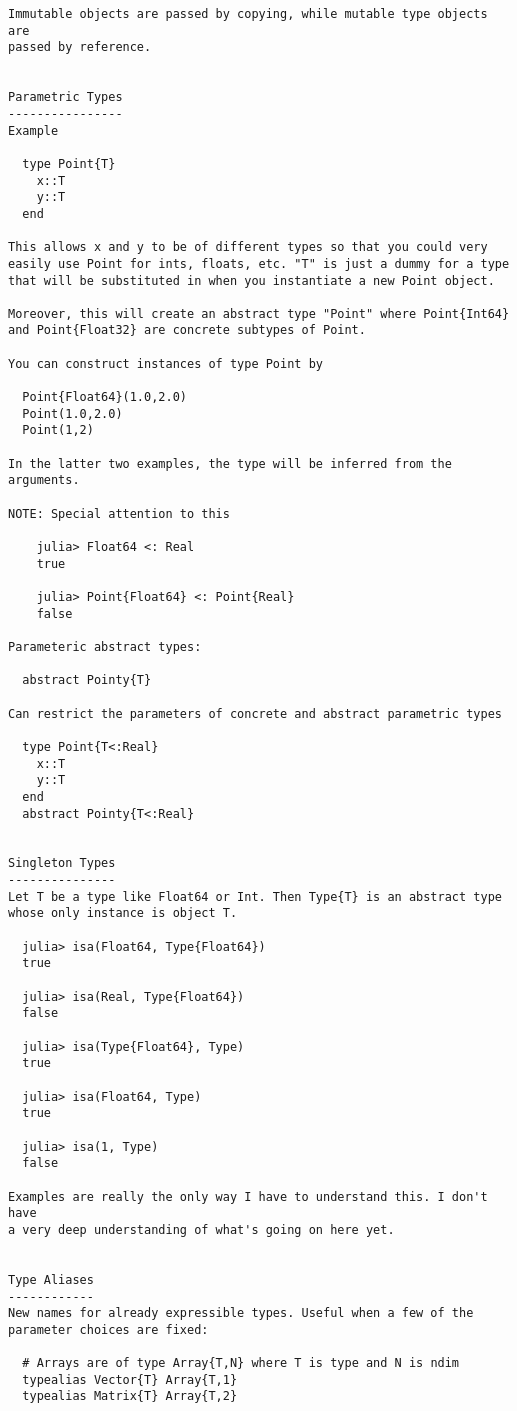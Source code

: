 \documentclass[12pt]{article}
\theoremstyle{plain}
\theoremstyle{definition}
\theoremstyle{remark}
\begin{document}
\begin{lstlisting}
Immutable objects are passed by copying, while mutable type objects are
passed by reference.


Parametric Types
----------------
Example

  type Point{T}
    x::T
    y::T
  end

This allows x and y to be of different types so that you could very
easily use Point for ints, floats, etc. "T" is just a dummy for a type
that will be substituted in when you instantiate a new Point object.

Moreover, this will create an abstract type "Point" where Point{Int64}
and Point{Float32} are concrete subtypes of Point.

You can construct instances of type Point by

  Point{Float64}(1.0,2.0)
  Point(1.0,2.0)
  Point(1,2)

In the latter two examples, the type will be inferred from the
arguments.

NOTE: Special attention to this

    julia> Float64 <: Real
    true

    julia> Point{Float64} <: Point{Real}
    false

Parameteric abstract types:

  abstract Pointy{T}

Can restrict the parameters of concrete and abstract parametric types

  type Point{T<:Real}
    x::T
    y::T
  end
  abstract Pointy{T<:Real}


Singleton Types
---------------
Let T be a type like Float64 or Int. Then Type{T} is an abstract type
whose only instance is object T.

  julia> isa(Float64, Type{Float64})
  true

  julia> isa(Real, Type{Float64})
  false

  julia> isa(Type{Float64}, Type)
  true

  julia> isa(Float64, Type)
  true

  julia> isa(1, Type)
  false

Examples are really the only way I have to understand this. I don't have
a very deep understanding of what's going on here yet.


Type Aliases
------------
New names for already expressible types. Useful when a few of the
parameter choices are fixed:

  # Arrays are of type Array{T,N} where T is type and N is ndim
  typealias Vector{T} Array{T,1}
  typealias Matrix{T} Array{T,2}



\end{lstlisting}
\end{document}
